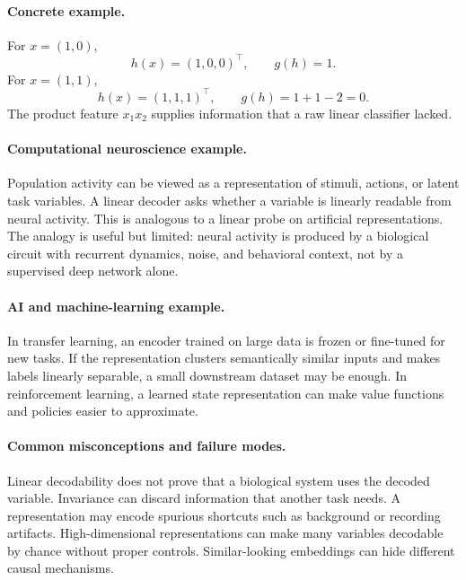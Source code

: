 \paragraph{Concrete example.}
For \(x=(1,0)\),
\[
h(x)=(1,0,0)^\top,\qquad g(h)=1.
\]
For \(x=(1,1)\),
\[
h(x)=(1,1,1)^\top,\qquad g(h)=1+1-2=0.
\]
The product feature \(x_1x_2\) supplies information that a raw linear classifier lacked.

\paragraph{Computational neuroscience example.}
Population activity can be viewed as a representation of stimuli, actions, or latent task variables. A linear decoder asks whether a variable is linearly readable from neural activity. This is analogous to a linear probe on artificial representations. The analogy is useful but limited: neural activity is produced by a biological circuit with recurrent dynamics, noise, and behavioral context, not by a supervised deep network alone.

\paragraph{AI and machine-learning example.}
In transfer learning, an encoder trained on large data is frozen or fine-tuned for new tasks. If the representation clusters semantically similar inputs and makes labels linearly separable, a small downstream dataset may be enough. In reinforcement learning, a learned state representation can make value functions and policies easier to approximate.

\paragraph{Common misconceptions and failure modes.}
Linear decodability does not prove that a biological system uses the decoded variable. Invariance can discard information that another task needs. A representation may encode spurious shortcuts such as background or recording artifacts. High-dimensional representations can make many variables decodable by chance without proper controls. Similar-looking embeddings can hide different causal mechanisms.


